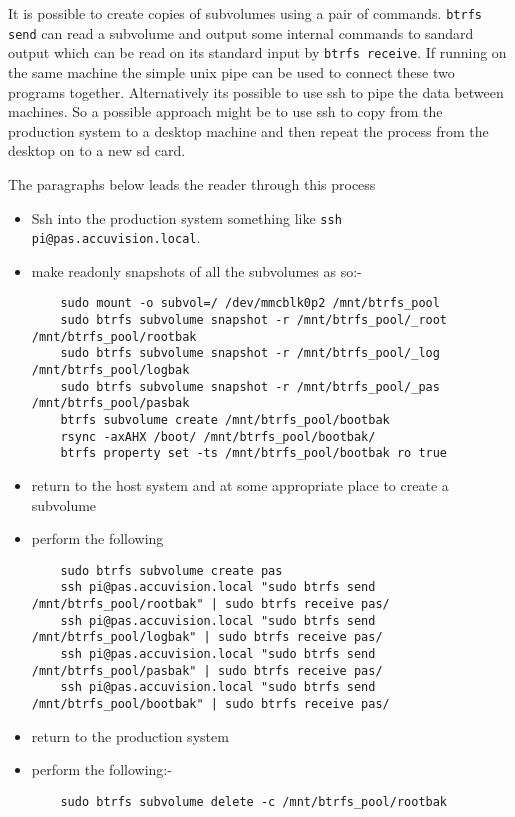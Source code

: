 \documentclass[Draft]{akc}
\begin{document}
It is possible to create copies of subvolumes using a pair of commands.  \texttt{btrfs send} can read a subvolume
and output some internal commands to sandard output which can be read on its standard input by \texttt{btrfs receive}.
If running on the same machine the simple unix pipe can be used to connect these two programs together.  Alternatively its
possible to use ssh to pipe the data between machines.  So a possible approach might be to use ssh to copy from the production
system to a desktop machine and then repeat the process from the desktop on to a new sd card.

The paragraphs below leads the reader through this process

\begin{itemize}
  \item Ssh into the production system something like \texttt{ssh pi@pas.accuvision.local}.
  \item make readonly snapshots of all the subvolumes as so:-
  \begin{lstlisting}
    sudo mount -o subvol=/ /dev/mmcblk0p2 /mnt/btrfs_pool
    sudo btrfs subvolume snapshot -r /mnt/btrfs_pool/_root /mnt/btrfs_pool/rootbak
    sudo btrfs subvolume snapshot -r /mnt/btrfs_pool/_log /mnt/btrfs_pool/logbak
    sudo btrfs subvolume snapshot -r /mnt/btrfs_pool/_pas /mnt/btrfs_pool/pasbak
    btrfs subvolume create /mnt/btrfs_pool/bootbak
    rsync -axAHX /boot/ /mnt/btrfs_pool/bootbak/
    btrfs property set -ts /mnt/btrfs_pool/bootbak ro true
  \end{lstlisting}
  \item return to the host system and at some appropriate place to create a subvolume
  \item perform the following
  \begin{lstlisting}
    sudo btrfs subvolume create pas
    ssh pi@pas.accuvision.local "sudo btrfs send /mnt/btrfs_pool/rootbak" | sudo btrfs receive pas/
    ssh pi@pas.accuvision.local "sudo btrfs send /mnt/btrfs_pool/logbak" | sudo btrfs receive pas/
    ssh pi@pas.accuvision.local "sudo btrfs send /mnt/btrfs_pool/pasbak" | sudo btrfs receive pas/
    ssh pi@pas.accuvision.local "sudo btrfs send /mnt/btrfs_pool/bootbak" | sudo btrfs receive pas/
  \end{lstlisting}
  \item return to the production system
  \item perform the following:-
  \begin{lstlisting}
    sudo btrfs subvolume delete -c /mnt/btrfs_pool/rootbak

\end{lstlisting}
\end{itemize}
\end{document}
